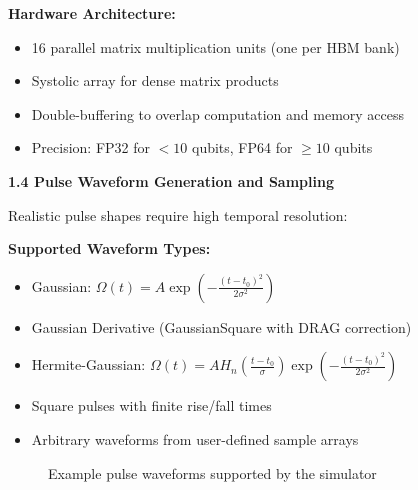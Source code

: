 \documentclass[12pt,a4paper]{article}
\begin{document}
\textbf{Hardware Architecture:}
\begin{itemize}[noitemsep]
\item 16 parallel matrix multiplication units (one per HBM bank)
\item Systolic array for dense matrix products
\item Double-buffering to overlap computation and memory access
\item Precision: FP32 for $<10$ qubits, FP64 for $\geq 10$ qubits
\end{itemize}

\textbf{1.4 Pulse Waveform Generation and Sampling}

Realistic pulse shapes require high temporal resolution:

\textbf{Supported Waveform Types:}
\begin{itemize}[noitemsep]
\item Gaussian: $\Omega(t) = A \exp\left(-\frac{(t-t_0)^2}{2\sigma^2}\right)$
\item Gaussian Derivative (GaussianSquare with DRAG correction)
\item Hermite-Gaussian: $\Omega(t) = A H_n\left(\frac{t-t_0}{\sigma}\right) \exp\left(-\frac{(t-t_0)^2}{2\sigma^2}\right)$
\item Square pulses with finite rise/fall times
\item Arbitrary waveforms from user-defined sample arrays
\end{itemize}

\begin{figure}[h]
\centering
{}
\caption{Example pulse waveforms supported by the simulator}
\label{fig:pulse_waveforms}
\end{figure}
\end{document}
